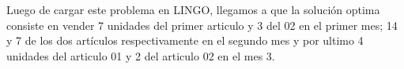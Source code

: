 
\begin{homeworkProblem}[-1][MKJ]
Luego de cargar este problema en LINGO, llegamos a que la solución optima consiste en vender 7 unidades del primer articulo y 3 del 02 en el primer mes; 14 y 7 de los dos artículos respectivamente en el segundo mes y por ultimo 4 unidades del articulo 01 y 2 del articulo 02 en el mes 3.
\end{homeworkProblem}


